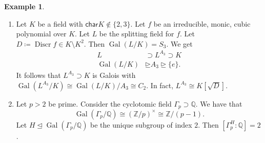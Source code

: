 \documentclass[10pt,letterpaper,cm]{nupset}
\theoremstyle{definition}
\newtheorem{exmp}{Example}
\newcommand{\Q}{\mathbb Q}
\newcommand{\Z}{\mathbb Z}
\newcommand{\1}{\mathbf{1}}
\newcommand{\0}{\vec 0}
\newcommand{\Char}{\mathsf{char}}
\DeclareMathOperator{\gal}{Gal}
\DeclareMathOperator{\disc}{Discr}
\begin{document}
\begin{exmp} $ $
\begin{enumerate}
\item Let $K$ be a field with $\Char{K} \notin \{2,3\}$. Let $f$ be an irreducible, monic, cubic polynomial over $K$. Let $L$ be the splitting field for $f$. Let $D\coloneqq  \disc{f} \in K \setminus K^2$. Then $\gal(L/K) = S_3$. We get
\begin{align*} L & \supset L^{A_3} \supset K  \\   \gal(L/K)  & \unrhd A_3 \unrhd \{e\}  . \end{align*} It follows that $L^{A_3}\supset K$ is Galois with $\gal(L^{A_3}/K) \cong \gal(L/K)/A_3 \cong C_2$. In fact, $L^{A_3} \cong K[\sqrt{D}]$.
\item Let $p>2$ be prime. Consider the cyclotomic field $\Gamma_p \supset \Q$. We have that $$   \gal(\Gamma_p/\Q) \cong (\Z/p)^{\times} \cong \Z/(p-1) .$$ Let $H \unlhd \gal(\Gamma_p/\Q)$ be the unique subgroup of index $2$. Then $[\Gamma_p^H :\Q] =2$.


\end{enumerate}
\end{exmp}
\end{document}

